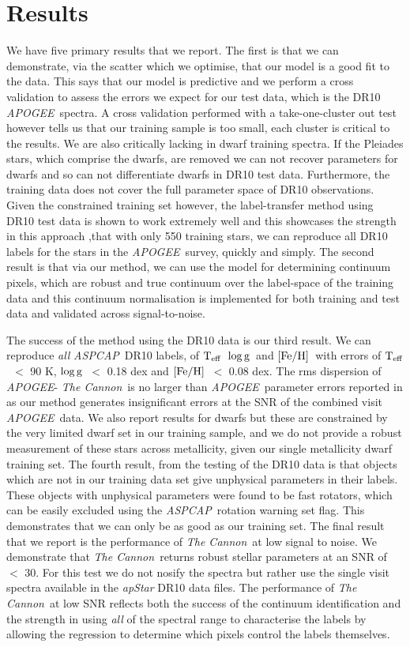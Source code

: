 \documentclass[12pt, preprint]{aastex}
\newcommand{\teff}{\mbox{$\rm T_{eff}$}}
\newcommand{\feh}{\mbox{$\rm [Fe/H]$}}
\newcommand{\logg}{\mbox{$\rm \log g$}}
\newcommand{\tc}{\textsl{The Cannon}}
\newcommand{\apogee}{\textsl{APOGEE}}
\newcommand{\aspcap}{\textsl{ASPCAP}}
\begin{document}
\section{Results}
\label{sec:results}

We have five primary results that we report. The first is that we can demonstrate, via the scatter which we optimise, that our model is a good fit to the data. This says that our model is predictive and we perform a cross validation to assess the errors we expect for our test data, which is the DR10 \apogee\ spectra. A cross validation performed with a take-one-cluster out test however tells us that our training sample is too small, each cluster is critical to the results. We are also critically lacking in dwarf training spectra. If the Pleiades stars, which comprise the dwarfs, are removed we can not recover parameters for dwarfs and so can not differentiate dwarfs in DR10 test data. Furthermore, the training data does not cover the full parameter space of DR10 observations. Given the constrained training set however, the label-transfer method using DR10 test data is shown to work extremely well and this showcases the strength in this approach ,that with only 550 training stars, we can reproduce all DR10 labels for the stars in the \apogee\ survey, quickly and simply.  The second result is that via our method, we can use the model for determining continuum pixels, which are robust and true continuum over the label-space of the training data and this continuum normalisation is implemented for both training and test data and validated across signal-to-noise. 

The success of the method using the DR10 data is our third result. We can reproduce \textit{all} \aspcap\ DR10 labels, of \teff\, \logg\ and \feh\ with errors of \teff\ $<$ 90 K, \logg\ $<$ 0.18 dex and \feh\ $<$ 0.08 dex. The rms dispersion of \apogee - \tc\ is no larger than \apogee\ parameter errors reported in \citep{Meszaros} as our method generates insignificant errors at the SNR of the combined visit \apogee\ data. We also report results for dwarfs but these are constrained by the very limited dwarf set in our training sample, and we do not provide a robust measurement of these stars across metallicity, given our single metallicity dwarf training set. The fourth result, from the testing of the DR10 data is that objects which are not in our training data set give unphysical parameters in their labels. These objects with unphysical parameters were found to be fast rotators, which can be easily excluded using the \aspcap\ rotation warning set flag. This demonstrates that we can only be as good as our training set. The final result that we report is the performance of \tc\ at low signal to noise. We demonstrate that \tc\ returns robust stellar parameters at an SNR of $<$ 30. For this test we do not nosify the spectra but rather use the single visit spectra available in the \textit{apStar} DR10 data files. The performance of \tc\ at low SNR reflects both the success of the continuum identification and the strength in using \textit{all} of the spectral range to characterise the labels by allowing the regression to determine which pixels control the labels themselves.
\end{document}
